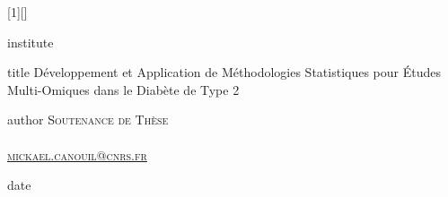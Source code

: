 [1][]{
    \renewcommand{\baselinestretch}{1.25}
    \begin{centering}
        \begin{beamercolorbox}[sep=3pt,center,#1]{institute}
            {\LaboratoryFont\textsc{\insertinstitute}}
        \end{beamercolorbox}
        \begin{beamercolorbox}[sep=8pt, center, colsep=-4bp, rounded=true, shadow=true, #1]{title}
            \MyTitlePageTitleFont Développement et Application de Méthodologies Statistiques pour Études Multi-Omiques dans le Diabète de Type 2\par%
            {\MySubTitlePageTitleFont{}\textit{\insertsubtitle}\par}%
        \end{beamercolorbox}%
        \begin{beamercolorbox}[sep=8pt,center,#1]{author}
            {\MyNameFont\textsc{\texorpdfstring{Soutenance de Thèse\\\insertauthor\\ \vskip -0.25cm \href{mailto:mickael.canouil@cnrs.fr}{{\MyMailFont mickael.canouil@cnrs.fr}}}{\insertauthor}}}
        \end{beamercolorbox}
        \vskip -0.25cm
        \begin{beamercolorbox}[sep=8pt,center,#1]{}
            {\MyNameFont\@cst}
        \end{beamercolorbox}
        \vskip -0.25cm
        \begin{beamercolorbox}[sep=8pt,center,#1]{date}
            {\MyNameFont{\small{\color{springgreen3!70!white}\insertdate}}}
        \end{beamercolorbox}
        \vskip -0.25cm
        {\inserttitlegraphic\par}
    \end{centering}
}




\newcommand\bref[2]{\hyperref[#1]{#2~\ref*{#1}}}
\newcommand\cmd[1]{\texttt{\color{black}\textbf{#1}}}
\newcommand\cmdb[1]{\texttt{\color{dodgerblue}\textbf{#1}}}
\newcommand\cmdr[1]{\texttt{\color{firebrick2}\textbf{#1}}}
\newcommand\cmdg[1]{\texttt{\color{springgreen3}\textbf{#1}}}
\newcommand\cmdy[1]{\texttt{\color{goldenrod2}\textbf{#1}}}
\newcommand\blue[1]{{\color{dodgerblue}\textbf{#1}}}
\newcommand\red[1]{{\color{firebrick2}\textbf{#1}}}
\newcommand\green[1]{{\color{springgreen3}\textbf{#1}}}
\newcommand\yellow[1]{{\color{goldenrod2}\textbf{#1}}}
\newcommand\pql{{\rmfamily \textbf{\color{goldenrod2}``}}}
\newcommand\pqr{{\rmfamily \textbf{\color{goldenrod2}''}}}
\newcommand\pq[3]{{\rmfamily \textbf{\color{#3}``}}#1{\rmfamily \textbf{\color{#3}''}} - \textcolor{#3}{#2}}

